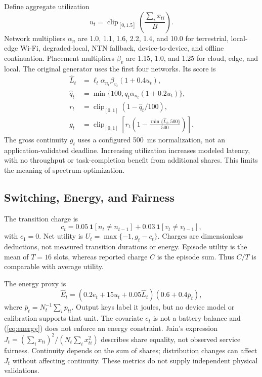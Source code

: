 \documentclass[10pt,twocolumn]{article}
\begin{document}
Define aggregate utilization
\begin{equation}u_t=\operatorname{clip}_{[0,1.5]}\left(\frac{\sum_i x_{ti}}{B}\right).\end{equation}
Network multipliers $\alpha_n$ are 1.0, 1.1, 1.6, 2.2, 1.4, and 10.0 for terrestrial, local-edge Wi-Fi, degraded-local, NTN fallback, device-to-device, and offline continuation. Placement multipliers $\beta_v$ are 1.15, 1.0, and 1.25 for cloud, edge, and local. The original generator uses the first four networks. Its score is
\begin{align}
\widehat L_t&=\ell_t\alpha_{n_t}\beta_{v_t}(1+0.4u_t),\label{eq:latency}\\
\widehat q_t&=\min\{100,q_t\alpha_{n_t}(1+0.2u_t)\},\\
r_t&=\operatorname{clip}_{[0,1]}(1-\widehat q_t/100),\\
g_t&=\operatorname{clip}_{[0,1]}\!\left[r_t\left(1-\frac{\min\{\widehat L_t,500\}}{500}\right)\right].\label{eq:gross}
\end{align}
The gross continuity $g_t$ uses a configured 500~ms normalization, not an application-validated deadline. Increasing utilization increases modeled latency, with no throughput or task-completion benefit from additional shares. This limits the meaning of spectrum optimization.

\subsection{Switching, Energy, and Fairness}
The transition charge is
\begin{equation}c_t=0.05\,\mathbf{1}[n_t\ne n_{t-1}]+0.03\,\mathbf{1}[v_t\ne v_{t-1}],\label{eq:cost}\end{equation}
with $c_1=0$. Net utility is $U_t=\max\{-1,g_t-c_t\}$. Charges are dimensionless deductions, not measured transition durations or energy. Episode utility is the mean of $T=16$ slots, whereas reported charge $C$ is the episode sum. Thus $C/T$ is comparable with average utility.

The energy proxy is
\begin{equation}\widehat E_t=(0.2e_t+15u_t+0.05\widehat L_t)(0.6+0.4\bar p_t),\label{eq:energy}\end{equation}
where $\bar p_t=N_t^{-1}\sum_i p_{ti}$. Output keys label it joules, but no device model or calibration supports that unit. The covariate $e_t$ is not a battery balance and (\ref{eq:energy}) does not enforce an energy constraint. Jain's expression $J_t=(\sum_i x_{ti})^2/(N_t\sum_i x_{ti}^2)$ describes share equality, not observed service fairness. Continuity depends on the sum of shares; distribution changes can affect $J_t$ without affecting continuity. These metrics do not supply independent physical validations.
\end{document}
